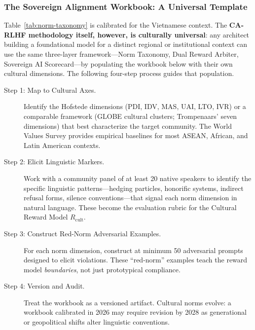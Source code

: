 \subsubsection{The Sovereign Alignment Workbook: A Universal Template}
\label{subsubsec:sovereign_workbook}

Table~\ref{tab:norm-taxonomy} is calibrated for the Vietnamese context. The \textbf{CA-RLHF methodology itself, however, is culturally universal}: any architect building a foundational model for a distinct regional or institutional context can use the same three-layer framework---Norm Taxonomy, Dual Reward Arbiter, Sovereign AI Scorecard---by populating the workbook below with their own cultural dimensions. The following four-step process guides that population.

\begin{description}
  \item[Step 1: Map to Cultural Axes.]
    Identify the Hofstede dimensions (PDI, IDV, MAS, UAI, LTO, IVR) or a comparable framework (GLOBE cultural clusters; Trompenaars' seven dimensions) that best characterize the target community. The World Values Survey provides empirical baselines for most ASEAN, African, and Latin American contexts.
  \item[Step 2: Elicit Linguistic Markers.]
    Work with a community panel of at least 20 native speakers to identify the specific linguistic patterns---hedging particles, honorific systems, indirect refusal forms, silence conventions---that signal each norm dimension in natural language. These become the evaluation rubric for the Cultural Reward Model $R_\mathrm{cult}$.
  \item[Step 3: Construct Red-Norm Adversarial Examples.]
    For each norm dimension, construct at minimum 50 adversarial prompts designed to elicit violations. These ``red-norm'' examples teach the reward model \emph{boundaries}, not just prototypical compliance.
  \item[Step 4: Version and Audit.]
    Treat the workbook as a versioned artifact. Cultural norms evolve: a workbook calibrated in 2026 may require revision by 2028 as generational or geopolitical shifts alter linguistic conventions.
\end{description}

